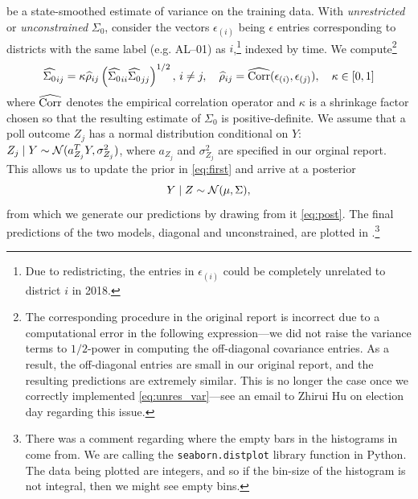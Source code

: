 \documentclass[12pt]{article}
\newcommand{\cm}{{\color{Red}{\textsf{[C]}}}}
\begin{document}
be a state-smoothed estimate of variance on the training data. With \emph{unrestricted} or \emph{unconstrained} $\Sigma_0$, consider the vectors $\epsilon_{(i)}$ being $\epsilon$ entries corresponding to districts with the same label (e.g. AL--01) as $i$,\footnote{Due to redistricting, the entries in $\epsilon_{(i)}$ could be completely unrelated to district $i$ in 2018.} indexed by time. We compute\footnote{\cm{} The corresponding procedure in the original report is incorrect due to a computational error in the following expression---we did not raise the variance terms to $1/2$-power in computing the off-diagonal covariance entries. As a result, the off-diagonal entries are small in our original report, and the resulting predictions are extremely similar. This is no longer the case once we correctly implemented \eqref{eq:unres_var}---see an email to Zhirui Hu on election day regarding this issue.} \begin{equation}
  \widehat{\Sigma_0}_{ij} = \kappa \widehat \rho_{ij} \left({\widehat {\Sigma_0}_{ii} \widehat {\Sigma_0}_{jj}}\right)^{1/2},\, i\neq j,\quad \widehat \rho_{ij} = \widehat{\operatorname{Corr}}(\epsilon_{(i)}, \epsilon_{(j)}), \quad \kappa\in [0,1]
\label{eq:unres_var}
\end{equation}
where $\widehat{\operatorname{Corr}}$ denotes the empirical correlation operator and $\kappa$ is a shrinkage factor chosen so that the resulting estimate of $\Sigma_0$ is positive-definite. We assume that a poll outcome $Z_j$ has a normal distribution conditional on $Y$: $Z_j \mid Y \sim \mathcal{N}(a_{Z_j}^T Y, \sigma_{Z_j}^2)$, where $a_{Z_j}$ and $\sigma_{Z_j}^2$ are specified in our orginal report. This allows us to update the prior in \eqref{eq:first} and arrive at a posterior \begin{equation}
  Y \mid Z \sim \mathcal{N}(\mu, \Sigma),
  \label{eq:post}
\end{equation}
from which we generate our predictions by drawing from it \eqref{eq:post}. The final predictions of the two models, diagonal and unconstrained, are plotted in .\footnote{\cm{} There was a comment regarding where the empty bars in the histograms in  come from. We are calling the \texttt{seaborn.distplot} library function in Python. The data being plotted are integers, and so if the bin-size of the histogram is not integral, then we might see empty bins. }
\end{document}
